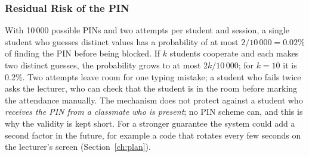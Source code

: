 \subsubsection{Residual Risk of the PIN}

With 10\,000 possible PINs and two attempts per student and session, a single student who guesses distinct values has a probability of at most $2/10\,000 = 0.02\%$ of finding the PIN before being blocked. If $k$ students cooperate and each makes two distinct guesses, the probability grows to at most $2k/10\,000$; for $k=10$ it is 0.2\%. Two attempts leave room for one typing mistake; a student who fails twice asks the lecturer, who can check that the student is in the room before marking the attendance manually. The mechanism does not protect against a student who \emph{receives the PIN from a classmate who is present}; no PIN scheme can, and this is why the validity is kept short. For a stronger guarantee the system could add a second factor in the future, for example a code that rotates every few seconds on the lecturer's screen (Section~\ref{ch:plan}).
